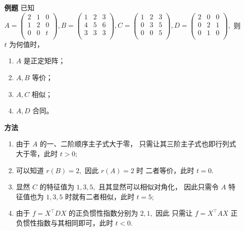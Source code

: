 \begin{itemize}
    \item[\textbf{例题}] 已知 $ A = \begin{pmatrix}
        2&1&0\\1&2&0\\0&0&t\\
    \end{pmatrix},
    B = \begin{pmatrix}
        1&2&3\\4&5&6\\3&3&3\\
    \end{pmatrix},
    C = \begin{pmatrix}
        1&2&3\\0&3&5\\0&0&5\\
    \end{pmatrix},
    D = \begin{pmatrix}
        2&0&0\\0&2&1\\0&1&0\\
    \end{pmatrix}, $ 则 $ t $ 为何值时，
    \begin{enumerate}[label = \Roman*.]
        \item $ A $ 是正定矩阵；
        \item $ A,B $ 等价；
        \item $ A,C $ 相似；
        \item $ A,D $ 合同。
    \end{enumerate}
    \item[\textbf{方法}] 
    \begin{enumerate}[label = \Roman*.]
        \item 由于 $ A $ 的一、二阶顺序主子式大于零，
        只需让其三阶主子式也即行列式大于零，此时 $ t > 0; $ 
        \item 可以知道 $ r(B) = 2, $ 因此 $ r(A) = 2 $ 时
        二者等价，此时 $ t = 0. $ 
        \item 显然 $ C $ 的特征值为 $ 1,3,5, $ 且其显然可以相似对角化，
        因此只需令 $ A $ 特征值也为 $ 1,3,5 $ 时就有二者相似，此时 $ t = 5; $ 
        \item 由于 $ f = X^\top DX $ 的正负惯性指数分别为 $ 2,1, $ 因此
        只需让 $ f = X^\top AX $ 正负惯性指数与其相同即可，此时 $ t<0. $  
    \end{enumerate}
\end{itemize}

